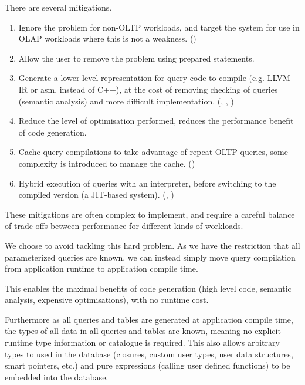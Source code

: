 \documentclass[conference]{IEEEtran}
\begin{document}
There are several mitigations.
\begin{enumerate}
    \item Ignore the problem for non-OLTP workloads, and target the system for use in OLAP workloads where this is not a weakness. (\cite{HIQUE}) %
    \item Allow the user to remove the problem using prepared statements. %
    \item Generate a lower-level representation for query code to compile (e.g. LLVM IR or asm, instead of C++), at the cost of
          removing checking of queries (semantic analysis) and more difficult implementation. (\cite{HyperEfficientCompilation}, \cite{AdaptiveExecution}, \cite{PracticalCodegen}) %
    \item Reduce the level of optimisation performed, reduces the performance benefit of code generation.
    \item Cache query compilations to take advantage of repeat OLTP queries, some complexity is introduced to manage the cache. (\cite{MemSQL}) %
    \item Hybrid execution of queries with an interpreter, before switching to the compiled version (a JIT-based system). (\cite{wagner2024incremental}, \cite{AdaptiveExecution}) %
\end{enumerate}
These mitigations are often complex to implement, and require a careful balance of trade-offs between performance for different
kinds of workloads.

We choose to avoid tackling this hard problem. As we have the restriction that all parameterized queries are
known, we can instead simply move query compilation from application runtime to application compile time.

This enables the maximal benefits of code generation (high level code, semantic analysis, expensive
optimisations), with no runtime cost.

Furthermore as all queries and tables are generated at application compile time, the types of all data in all queries
and tables are known, meaning no explicit runtime type information or catalogue is required. This also allows arbitrary
types to used in the database (closures, custom user types, user data structures, smart pointers, etc.) and pure expressions
(calling user defined functions) to be embedded into the database.
\end{document}
